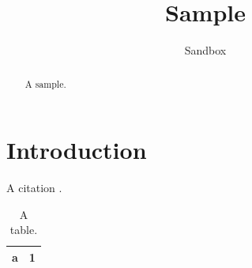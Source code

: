 \documentclass[11pt]{article}
\title{Sample}
\author{Sandbox}
\begin{document}
\maketitle
\begin{abstract}A sample.\end{abstract}
\section{Introduction}
A citation \citep{sample}.
\begin{table}[h]\centering\begin{tabular}{lr}\toprule a & 1\\\bottomrule\end{tabular}\caption{A table.}\end{table}


\end{document}
